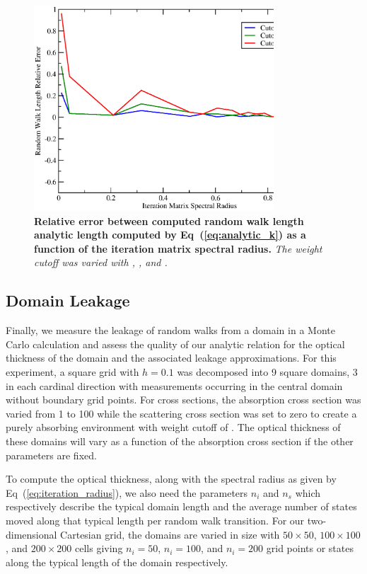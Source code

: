 \documentclass[preprint,11pt]{elsarticle}
\begin{document}
\begin{figure}[ht!]
  \begin{center}
    \includegraphics[width=0.8\textwidth]{random_walk_error.eps}
  \end{center}
  \caption{\textbf{Relative error between computed random walk length analytic
      length computed by Eq~(\ref{eq:analytic_k}) as a function of the
      iteration matrix spectral radius.} \textit{The weight cutoff was varied
      with , , and .}}
  \label{fig:measured_length_error}
\end{figure}

\subsection{Domain Leakage}
\label{subsec:domain_leakage}

Finally, we measure the leakage of random walks from a domain in a Monte Carlo
calculation and assess the quality of our analytic relation for the optical
thickness of the domain and the associated leakage approximations. For this
experiment, a square grid with $h=0.1$ was decomposed into 9 square domains, 3
in each cardinal direction with measurements occurring in the central domain
without boundary grid points. For cross sections, the absorption cross section
was varied from 1 to 100 while the scattering cross section was set to zero to
create a purely absorbing environment with weight cutoff of . The
optical thickness of these domains will vary as a function of the absorption
cross section if the other parameters are fixed.

To compute the optical thickness, along with the spectral radius as given by
Eq~(\ref{eq:iteration_radius}), we also need the parameters $n_i$ and $n_s$
which respectively describe the typical domain length and the average number
of states moved along that typical length per random walk transition. For our
two-dimensional Cartesian grid, the domains are varied in size with $50 \times
50$, $100 \times 100$, and $200 \times 200$ cells giving $n_i=50$, $n_i=100$,
and $n_i=200$ grid points or states along the typical length of the domain
respectively.
\end{document}
